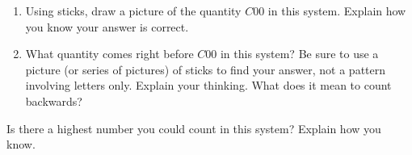 \documentclass[nooutcomes,noauthor,handout]{ximera}
\begin{document}
\begin{problem}
\begin{enumerate}
	\item Using sticks, draw a picture of the quantity $C00$ in this system. Explain how you know your answer is correct.
	\item What quantity comes right before $C00$ in this system? Be sure to use a picture (or series of pictures) of sticks to find your answer, not a pattern involving letters only. Explain your thinking. What does it mean to count backwards?
\end{enumerate}
\end{problem}


\begin{problem}
Is there a highest number you could count in this system? Explain how you know. 
\end{problem}


\end{document}
